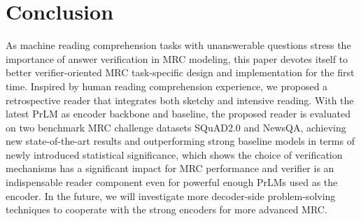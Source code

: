 \documentclass[letterpaper]{article} \usepackage{aaai21}  \usepackage{times}  \usepackage{helvet} \usepackage{courier}  \usepackage[hyphens]{url}  \usepackage{graphicx}
\begin{document}
\section{Conclusion}
As machine reading comprehension tasks with unanswerable questions stress the importance of answer verification in MRC modeling, this paper devotes itself to better verifier-oriented MRC task-specific design and implementation for the first time. Inspired by human reading comprehension experience, we proposed a retrospective reader that integrates both sketchy and intensive reading. With the latest PrLM as encoder backbone and baseline, the proposed reader is evaluated on two benchmark MRC challenge datasets SQuAD2.0 and NewsQA, achieving new state-of-the-art results and outperforming strong baseline models in terms of newly introduced statistical significance, which shows the choice of verification mechanisms has a significant impact for MRC performance and verifier is an indispensable reader component even for powerful enough PrLMs used as the encoder. In the future, we will investigate more decoder-side problem-solving techniques to cooperate with the strong encoders for more advanced MRC.


\end{document}
